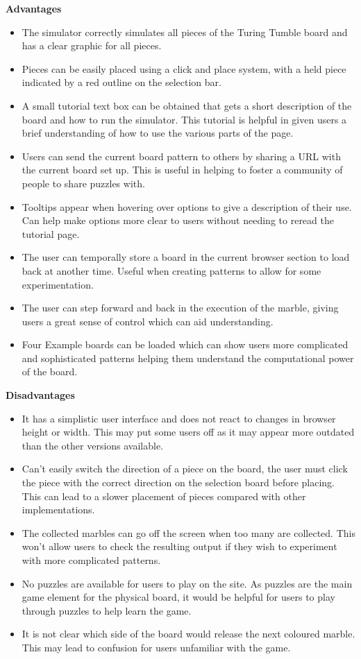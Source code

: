 \documentclass{l4proj}
\begin{document}
\textbf{Advantages}
\begin{itemize}
    \item The simulator correctly simulates all pieces of the Turing Tumble board and has a clear graphic for all pieces.
    \item Pieces can be easily placed using a click and place system, with a held piece indicated by a red outline on the selection bar.
    \item A small tutorial text box can be obtained that gets a short description of the board and how to run the simulator. This tutorial is helpful in given users a brief understanding of how to use the various parts of the page.
    \item Users can send the current board pattern to others by sharing a URL with the current board set up. This is useful in helping to foster a community of people to share puzzles with.
    \item Tooltips appear when hovering over options to give a description of their use. Can help make options more clear to users without needing to reread the tutorial page.
    \item The user can temporally store a board in the current browser section to load back at another time. Useful when creating patterns to allow for some experimentation.
    \item The user can step forward and back in the execution of the marble, giving users a great sense of control which can aid understanding.
    \item Four Example boards can be loaded which can show users more complicated and sophisticated patterns helping them understand the computational power of the board.
\end{itemize}

\textbf{Disadvantages}
\begin{itemize}
    \item It has a simplistic user interface and does not react to changes in browser height or width. This may put some users off as it may appear more outdated than the other versions available.
    \item Can't easily switch the direction of a piece on the board, the user must click the piece with the correct direction on the selection board before placing. This can lead to a slower placement of pieces compared with other implementations.
    \item The collected marbles can go off the screen when too many are collected. This won't allow users to check the resulting output if they wish to experiment with more complicated patterns.
    \item No puzzles are available for users to play on the site. As puzzles are the main game element for the physical board, it would be helpful for users to play through puzzles to help learn the game.
    \item It is not clear which side of the board would release the next coloured marble. This may lead to confusion for users unfamiliar with the game.
\end{itemize}
\end{document}
